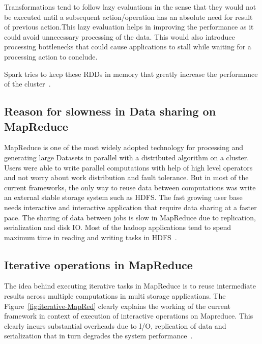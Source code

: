  Transformations tend to follow lazy evaluations in the sense that they would 
not be executed until a subsequent action/operation has an absolute need for 
result of previous action.This lazy evaluation helps in improving the 
performance as it could avoid unnecessary processing of the data. This would 
also introduce processing bottlenecks that could cause applications to stall 
while waiting for a processing action to conclude.

Spark tries to keep these RDDs in memory that greatly increase the performance 
of the cluster~\cite{hid-sp18-410-spark-RDD}.

\subsection{Reason for slowness in Data sharing on MapReduce}

MapReduce is one of the most widely adopted technology  for processing and 
generating large Datasets in parallel with a distributed algorithm on a cluster.
 Users were able to write parallel computations with help of high level 
 operators and not worry about work distribution and fault tolerance. But in 
 most of the current frameworks, the only way to reuse data between 
 computations was write an external stable storage system such as HDFS. 
The fast growing user base needs interactive and interactive application that 
require data sharing at a faster pace. The sharing of data between jobs is slow 
in MapReduce due to replication, serialization and disk IO. Most of the hadoop 
applications tend to spend maximum time in reading and 
writing tasks in HDFS~\cite{hid-sp18-410-spark-RDD}.

\subsection{Iterative operations in MapReduce}

The idea behind executing iterative tasks in MapReduce is to reuse intermediate 
results across multiple computations in multi storage applications. 
The Figure~\ref{fig:iterative-MapRed} clearly explains the working of the  
current framework in context of execution of interactive operations on 
Mapreduce. This clearly incurs substantial overheads due to I/O, replication of 
data and serialization that in turn degrades the system 
performance~\cite{hid-sp18-410-spark-RDD}. 

